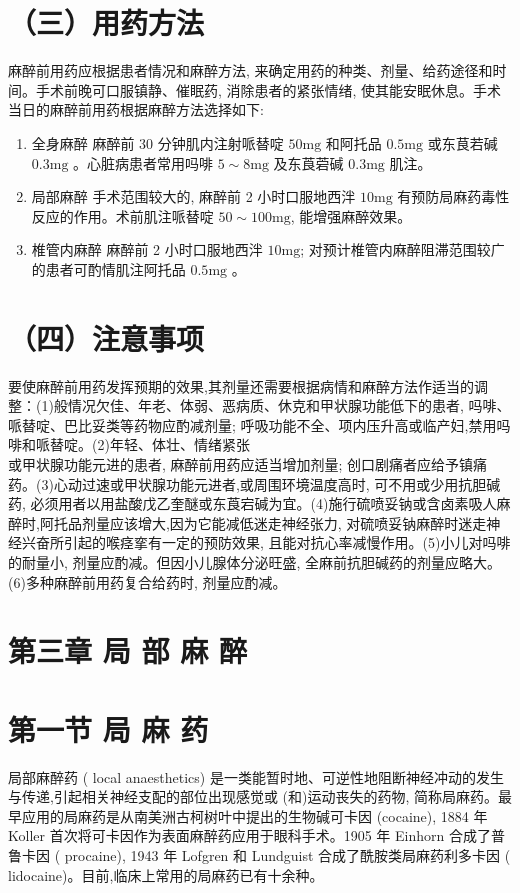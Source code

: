 \documentclass[10pt]{article}
\begin{document}
\section*{（三）用药方法}
麻醉前用药应根据患者情况和麻醉方法, 来确定用药的种类、剂量、给药途径和时间。手术前晚可口服镇静、催眠药, 消除患者的紧张情绪, 使其能安眠休息。手术当日的麻醉前用药根据麻醉方法选择如下:

\begin{enumerate}
  \item 全身麻醉 麻醉前 30 分钟肌内注射哌替啶 $50 \mathrm{mg}$ 和阿托品 $0.5 \mathrm{mg}$ 或东茛若碱 $0.3 \mathrm{mg}$ 。心脏病患者常用吗啡 $5 \sim 8 \mathrm{mg}$ 及东莨菪碱 $0.3 \mathrm{mg}$ 肌注。

  \item 局部麻醉 手术范围较大的, 麻醉前 2 小时口服地西泮 $10 \mathrm{mg}$ 有预防局麻药毒性反应的作用。术前肌注哌替啶 $50 \sim 100 \mathrm{mg}$, 能增强麻醉效果。

  \item 椎管内麻醉 麻醉前 2 小时口服地西泮 $10 \mathrm{mg}$; 对预计椎管内麻醉阻滞范围较广的患者可酌情肌注阿托品 $0.5 \mathrm{mg}$ 。

\end{enumerate}

\section*{（四）注意事项}
要使麻醉前用药发挥预期的效果,其剂量还需要根据病情和麻醉方法作适当的调整：(1)般情况欠佳、年老、体弱、恶病质、休克和甲状腺功能低下的患者, 吗啡、哌替啶、巴比妥类等药物应酌减剂量; 呼吸功能不全、项内压升高或临产妇,禁用吗啡和哌替啶。(2)年轻、体壮、情绪紧张\\
或甲状腺功能元进的患者, 麻醉前用药应适当增加剂量; 创口剧痛者应给予镇痛药。(3)心动过速或甲状腺功能元进者,或周围环境温度高时, 可不用或少用抗胆碱药, 必须用者以用盐酸戊乙奎醚或东莨宕碱为宜。(4)施行硫喷妥钠或含卤素吸人麻醉时,阿托品剂量应该增大,因为它能减低迷走神经张力, 对硫喷妥钠麻醉时迷走神经兴奋所引起的喉痉挛有一定的预防效果, 且能对抗心率减慢作用。(5)小儿对吗啡的耐量小, 剂量应酌减。但因小儿腺体分泌旺盛, 全麻前抗胆碱药的剂量应略大。(6)多种麻醉前用药复合给药时, 剂量应酌减。

\section*{第三章 局 部 麻 醉}
\section*{第一节 局 麻 药}
局部麻醉药 ( local anaesthetics) 是一类能暂时地、可逆性地阻断神经冲动的发生与传递,引起相关神经支配的部位出现感觉或 (和)运动丧失的药物, 简称局麻药。最早应用的局麻药是从南美洲古柯树叶中提出的生物碱可卡因 (cocaine), 1884 年 Koller 首次将可卡因作为表面麻醉药应用于眼科手术。1905 年 Einhorn 合成了普鲁卡因 ( procaine), 1943 年 Lofgren 和 Lundguist 合成了酰胺类局麻药利多卡因 ( lidocaine)。目前,临床上常用的局麻药已有十余种。
\end{document}
